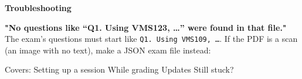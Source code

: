 \begin{pagecard}\label{sec:troubleshooting}
{\large\bfseries Troubleshooting}\par\smallskip
\textbf{"No questions like ``Q1. Using VMS123, \ldots{}'' were found in that file."} The exam's questions must start like \texttt{Q1. Using VMS109, \ldots{}}. If the PDF is a scan (an image with no text), make a JSON exam file instead:\par

{\small Covers: Setting up a session \textperiodcentered{} While grading \textperiodcentered{} Updates \textperiodcentered{} Still stuck?}
\tcblower
\centering\href{https://github.com/agadin/micro-speed-grader/blob/main/docs/help/troubleshooting.md}{}\\[3pt]
\end{pagecard}

\vspace{-20pt}